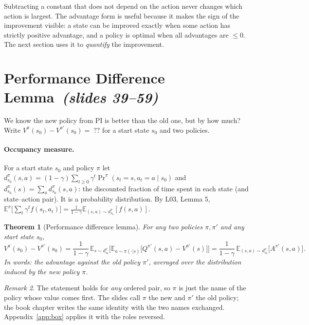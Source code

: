 \documentclass[11pt,a4paper]{article}
\newcommand{\E}{\mathbb{E}}
\newcommand{\occ}[2]{d^{#1}_{#2}}
\newcommand{\sltag}[1]{\texorpdfstring{\ \emph{(slides #1)}}{ (slides #1)}}
\theoremstyle{plain}
\newtheorem{theorem}{Theorem}[section]
\theoremstyle{definition}
\theoremstyle{remark}
\newtheorem{remark}[theorem]{Remark}
\begin{document}
\begin{intuition}
Subtracting a constant that does not depend on the action never changes which action is largest. The advantage form is useful because it makes the sign of the improvement visible: a state can be improved exactly when some action has strictly positive advantage, and a policy is optimal when all advantages are $\le0$. The next section uses it to \emph{quantify} the improvement.
\end{intuition}

\section{Performance Difference Lemma\sltag{39--59}}\label{sec:pdl}
We know the new policy from PI is better than the old one, but by how much? Write $V^\pi(s_0)-V^{\pi'}(s_0)=\;??$ for a start state $s_0$ and two policies.

\paragraph{Occupancy measure.} For a start state $s_0$ and policy $\pi$ let $\occ{\pi}{s_0}(s,a)=(1-\gamma)\sum_{t\ge0}\gamma^t\Pr^\pi(s_t=s,a_t=a\mid s_0)$ and $\occ{\pi}{s_0}(s)=\sum_a\occ{\pi}{s_0}(s,a)$: the discounted fraction of time spent in each state (and state--action pair). It is a probability distribution. By L03, Lemma 5, $\E^\pi\big[\sum_t\gamma^tf(s_t,a_t)\big]=\frac1{1-\gamma}\E_{(s,a)\sim\occ{\pi}{s_0}}[f(s,a)]$.

\begin{theorem}[Performance difference lemma]\label{thm:pdl}
For any two policies $\pi,\pi'$ and any start state $s_0$,
\[
V^{\pi}(s_0)-V^{\pi'}(s_0)=\frac{1}{1-\gamma}\,\E_{s\sim\occ{\pi}{s_0}}\Big[\E_{a\sim\pi(\cdot|s)}\big[Q^{\pi'}(s,a)-V^{\pi'}(s)\big]\Big]=\frac{1}{1-\gamma}\,\E_{(s,a)\sim\occ{\pi}{s_0}}\big[A^{\pi'}(s,a)\big].
\]
In words: the advantage against the \emph{old} policy $\pi'$, averaged over the distribution induced by the \emph{new} policy $\pi$.
\end{theorem}

\begin{remark}
The statement holds for \emph{any} ordered pair, so $\pi$ is just the name of the policy whose value comes first. The slides call $\pi$ the new and $\pi'$ the old policy; the book chapter writes the same identity with the two names exchanged. Appendix~\ref{app:box} applies it with the roles reversed.
\end{remark}
\end{document}
